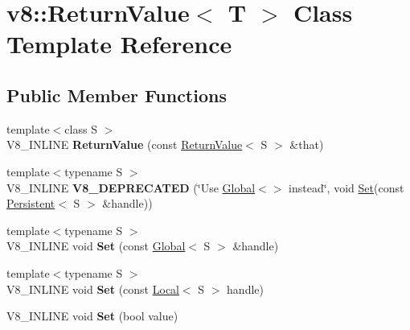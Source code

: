 \hypertarget{classv8_1_1ReturnValue}{}\section{v8\+:\+:Return\+Value$<$ T $>$ Class Template Reference}
\label{classv8_1_1ReturnValue}
\subsection*{Public Member Functions}
\begin{DoxyCompactItemize}
\item 
\mbox{\label{classv8_1_1ReturnValue_a0f1cdf01090e6fc957a0081036a55e6b}} 
{\footnotesize template$<$class S $>$ }\\V8\+\_\+\+I\+N\+L\+I\+NE {\bfseries Return\+Value} (const \mbox{\hyperlink{classv8_1_1ReturnValue}{Return\+Value}}$<$ S $>$ \&that)
\item 
\mbox{\label{classv8_1_1ReturnValue_a0453174f9d6ab50a5eb657e49ce75fdd}} 
{\footnotesize template$<$typename S $>$ }\\V8\+\_\+\+I\+N\+L\+I\+NE {\bfseries V8\+\_\+\+D\+E\+P\+R\+E\+C\+A\+T\+ED} (\char`\"{}Use \mbox{\hyperlink{classv8_1_1Global}{Global}}$<$$>$ instead\char`\"{}, void \mbox{\hyperlink{classv8_1_1Set}{Set}}(const \mbox{\hyperlink{classv8_1_1Persistent}{Persistent}}$<$ S $>$ \&handle))
\item 
\mbox{\label{classv8_1_1ReturnValue_acd7bacd0c0c42de6d7bc904b66fab5d6}} 
{\footnotesize template$<$typename S $>$ }\\V8\+\_\+\+I\+N\+L\+I\+NE void {\bfseries Set} (const \mbox{\hyperlink{classv8_1_1Global}{Global}}$<$ S $>$ \&handle)
\item 
\mbox{\label{classv8_1_1ReturnValue_a865bc8fbded0b17338d7109d8e63be7b}} 
{\footnotesize template$<$typename S $>$ }\\V8\+\_\+\+I\+N\+L\+I\+NE void {\bfseries Set} (const \mbox{\hyperlink{classv8_1_1Local}{Local}}$<$ S $>$ handle)
\item 
\mbox{\label{classv8_1_1ReturnValue_a74d13d68c48028d14934cf076b21fa70}} 
V8\+\_\+\+I\+N\+L\+I\+NE void {\bfseries Set} (bool value)
$$
\end{DoxyCompactItemize}
